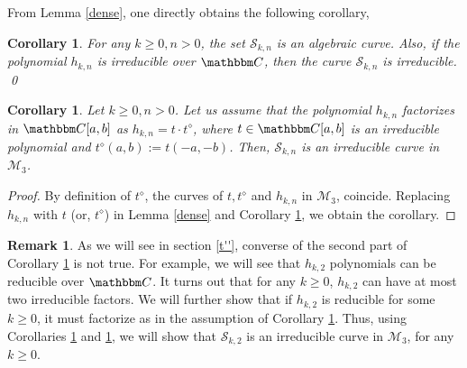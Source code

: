 \documentclass[reqno]{amsart}
\numberwithin{equation}{section}
\theoremstyle{plain}
\newtheorem{corollary}[theorem]{Corollary}
\theoremstyle{definition}
\newtheorem{remark}[theorem]{Remark}
\theoremstyle{definition}
\newcommand{\C}{{\mathbbm C}}
\begin{document}
    From Lemma \ref{dense}, one directly obtains the following corollary,
    \begin{corollary}\label{irrcoro}
        For any $k\geq 0, n>0$, the set $\mathscr{S}_{k,n}$ is an algebraic curve. Also, if the polynomial $h_{k,n}$ is irreducible over $\C$, then the curve $\mathscr{S}_{k,n}$ is irreducible. \qed
    \end{corollary}
    \begin{corollary}\label{redcoro}
        Let $k \geq 0, n>0$. Let us assume that the polynomial $h_{k,n}$ factorizes in $\C[a,b]$ as $h_{k,n}= t\cdot t^{\diamond}$, where $t\in \C[a,b]$ is an irreducible polynomial and $t^{\diamond}(a,b):= t(-a,-b)$. Then, $\mathscr{S}_{k,n}$ is an irreducible curve in $\mathcal{M}_{3}$. 
    \end{corollary}
    \begin{proof}
        By definition of $t^{\diamond}$, the curves of $t, t^{\diamond}$ and $h_{k,n}$ in $\mathcal{M}_{3}$, coincide. Replacing $h_{k,n}$ with $t$ (or, $t^{\diamond}$) in Lemma \ref{dense} and Corollary \ref{irrcoro}, we obtain the corollary.
    \end{proof}
    \begin{remark}
        As we will see in section \ref{t''}, converse of the second part of Corollary \ref{irrcoro} is not true. For example, we will see that $h_{k,2}$ polynomials can be reducible over $\C$. It turns out that for any $k\geq 0$, $h_{k,2}$ can have at most two irreducible factors. We will further show that if $h_{k,2}$ is reducible for some $k\geq 0$, it must factorize as in the assumption of Corollary \ref{redcoro}. Thus, using Corollaries \ref{irrcoro} and \ref{redcoro}, we will show that $\mathscr{S}_{k,2}$ is an irreducible curve in $\mathcal{M}_{3}$, for any $k\geq 0$.  
    \end{remark}
\end{document}
